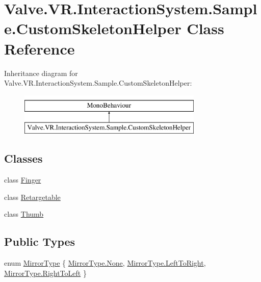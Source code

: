 \hypertarget{class_valve_1_1_v_r_1_1_interaction_system_1_1_sample_1_1_custom_skeleton_helper}{}\section{Valve.\+V\+R.\+Interaction\+System.\+Sample.\+Custom\+Skeleton\+Helper Class Reference}
\label{class_valve_1_1_v_r_1_1_interaction_system_1_1_sample_1_1_custom_skeleton_helper}
Inheritance diagram for Valve.\+V\+R.\+Interaction\+System.\+Sample.\+Custom\+Skeleton\+Helper\+:\begin{figure}[H]
\begin{center}
\leavevmode
\includegraphics[height=2.000000cm]{class_valve_1_1_v_r_1_1_interaction_system_1_1_sample_1_1_custom_skeleton_helper}
\end{center}
\end{figure}
\subsection*{Classes}
\begin{DoxyCompactItemize}
\item 
class \mbox{\hyperlink{class_valve_1_1_v_r_1_1_interaction_system_1_1_sample_1_1_custom_skeleton_helper_1_1_finger}{Finger}}
\item 
class \mbox{\hyperlink{class_valve_1_1_v_r_1_1_interaction_system_1_1_sample_1_1_custom_skeleton_helper_1_1_retargetable}{Retargetable}}
\item 
class \mbox{\hyperlink{class_valve_1_1_v_r_1_1_interaction_system_1_1_sample_1_1_custom_skeleton_helper_1_1_thumb}{Thumb}}
\end{DoxyCompactItemize}
\subsection*{Public Types}
\begin{DoxyCompactItemize}
\item 
enum \mbox{\hyperlink{class_valve_1_1_v_r_1_1_interaction_system_1_1_sample_1_1_custom_skeleton_helper_a19cf1f7c548cb676ab5ab16297b53e63}{Mirror\+Type}} \{ \mbox{\hyperlink{class_valve_1_1_v_r_1_1_interaction_system_1_1_sample_1_1_custom_skeleton_helper_a19cf1f7c548cb676ab5ab16297b53e63a6adf97f83acf6453d4a6a4b1070f3754}{Mirror\+Type.\+None}}, 
\mbox{\hyperlink{class_valve_1_1_v_r_1_1_interaction_system_1_1_sample_1_1_custom_skeleton_helper_a19cf1f7c548cb676ab5ab16297b53e63ad1e80c506f4c89e3c4fb1c1b4867a03c}{Mirror\+Type.\+Left\+To\+Right}}, 
\mbox{\hyperlink{class_valve_1_1_v_r_1_1_interaction_system_1_1_sample_1_1_custom_skeleton_helper_a19cf1f7c548cb676ab5ab16297b53e63ab7b0ea3028791689ea070674776855e2}{Mirror\+Type.\+Right\+To\+Left}}
 \}
\end{DoxyCompactItemize}
